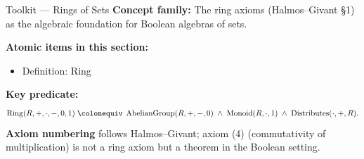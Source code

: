\begin{toolkitbox}{Toolkit --- Rings of Sets}
\textbf{Concept family:} The ring axioms (Halmos--Givant \S{}1) as the algebraic
foundation for Boolean algebras of sets.

\medskip
\textbf{Atomic items in this section:}
\begin{itemize}
  \item Definition: Ring
\end{itemize}

\medskip
\textbf{Key predicate:}
\[
  \operatorname{Ring}(R,+,\cdot,-,0,1)
  \;\colonequiv\;
  \operatorname{AbelianGroup}(R,+,-,0)
  \;\land\;
  \operatorname{Monoid}(R,\cdot,1)
  \;\land\;
  \operatorname{Distributes}(\cdot,+,R).
\]
\textbf{Axiom numbering} follows Halmos--Givant; axiom (4) (commutativity of
multiplication) is not a ring axiom but a theorem in the Boolean setting.
\end{toolkitbox}





